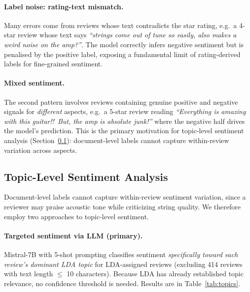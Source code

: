\documentclass[11pt]{article}
\begin{document}
\paragraph{Label noise: rating-text mismatch.}
Many errors come from reviews whose text contradicts the star
rating, e.g.\ a 4-star review whose text says \textit{``strings come
out of tune so easily, also makes a weird noise on the amp?''}.
The model correctly infers negative sentiment but is penalised by
the positive label, exposing a fundamental limit of rating-derived
labels for fine-grained sentiment.

\paragraph{Mixed sentiment.}
The second pattern involves reviews containing genuine positive and
negative signals for \textit{different} aspects, e.g.\ a 5-star
review reading \textit{``Everything is amazing with this guitar!!\
But, the amp is absolute junk!''} where the negative half drives the
model's prediction.
This is the primary motivation for topic-level sentiment analysis
(Section~\ref{sec:toplevel}): document-level labels cannot capture
within-review variation across aspects.

\subsection{Topic-Level Sentiment Analysis}
\label{sec:toplevel}

Document-level labels cannot capture within-review sentiment
variation, since a reviewer may praise acoustic tone while
criticizing string quality.
We therefore employ two approaches to topic-level sentiment.

\paragraph{Targeted sentiment via LLM (primary).}
Mistral-7B with 5-shot prompting classifies sentiment
\textit{specifically toward each review's dominant LDA topic}
for LDA-assigned reviews
(excluding 414 reviews with text length $\leq$ 10
characters).
Because LDA has already established topic relevance, no confidence
threshold is needed.
Results are in Table~\ref{tab:topics}.
\end{document}
